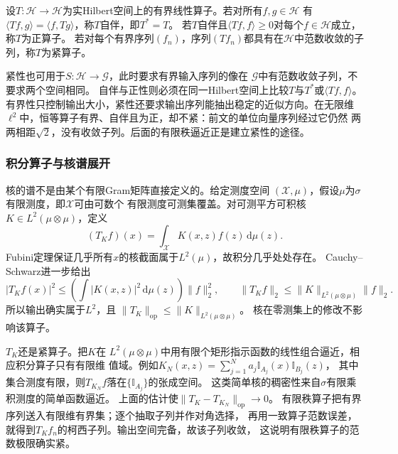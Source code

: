 \begin{definition}[自伴、正与紧算子]
\label{def:functional-operator-properties}
设$T:\mathcal H\to\mathcal H$为实Hilbert空间上的有界线性算子。若对所有$f,g\in\mathcal H$
有$\langle Tf,g\rangle=\langle f,Tg\rangle$，称$T$自伴，即$T^*=T$。
若$T$自伴且$\langle Tf,f\rangle\geq0$对每个$f\in\mathcal H$成立，称$T$为正算子。
若对每个有界序列$(f_n)$，序列$(Tf_n)$都具有在$\mathcal H$中范数收敛的子列，称$T$为紧算子。
\end{definition}
紧性也可用于$S:\mathcal H\to\mathcal G$，此时要求有界输入序列的像在
$\mathcal G$中有范数收敛子列，不要求两个空间相同。
自伴与正性则必须在同一Hilbert空间上比较$T$与$T^*$或$\langle Tf,f\rangle$。
有界性只控制输出大小，紧性还要求输出序列能抽出稳定的近似方向。在无限维
$\ell^2$中，恒等算子有界、自伴且为正，却不紧：前文的单位向量序列经过它仍然
两两相距$\sqrt2$，没有收敛子列。后面的有限秩逼近正是建立紧性的途径。

\subsubsection{积分算子与核谱展开}
\label{sec:functional-kernel-spectrum-regularization}

核的谱不是由某个有限Gram矩阵直接定义的。给定测度空间
$(\mathcal X,\mu)$，假设$\mu$为$\sigma$有限测度，即$\mathcal X$可由可数个
有限测度可测集覆盖。对可测平方可积核$K\in L^2(\mu\otimes\mu)$，定义
\begin{equation}
 (T_Kf)(x)=\int_{\mathcal X}K(x,z)f(z)\,\mathrm d\mu(z).
 \label{eq:functional-kernel-integral-operator}
\end{equation}
Fubini定理保证几乎所有$x$的核截面属于$L^2(\mu)$，故积分几乎处处存在。
Cauchy--Schwarz进一步给出
\[
 |T_Kf(x)|^2
 \leq\left(\int|K(x,z)|^2\,\mathrm d\mu(z)\right)\lVert f\rVert_2^2,\qquad
 \lVert T_Kf\rVert_2\leq\lVert K\rVert_{L^2(\mu\otimes\mu)}\lVert f\rVert_2.
\]
所以输出确实属于$L^2$，且
$\lVert T_K\rVert_{\mathrm{op}}\leq\lVert K\rVert_{L^2(\mu\otimes\mu)}$。
核在零测集上的修改不影响该算子。

$T_K$还是紧算子。把$K$在
$L^2(\mu\otimes\mu)$中用有限个矩形指示函数的线性组合逼近，相应积分算子只有有限维
值域。例如$K_N(x,z)=\sum_{j=1}^N a_j\mathbb I_{A_j}(x)\mathbb I_{B_j}(z)$，
其中集合测度有限，则$T_{K_N}f$落在$\{\mathbb I_{A_j}\}$的张成空间。
这类简单核的稠密性来自$\sigma$有限乘积测度的简单函数逼近。
上面的估计使$\lVert T_K-T_{K_N}\rVert_{\mathrm{op}}\to0$。
有限秩算子把有界序列送入有限维有界集；逐个抽取子列并作对角选择，
再用一致算子范数误差，就得到$T_Kf_n$的柯西子列。输出空间完备，故该子列收敛，
这说明有限秩算子的范数极限确实紧。

